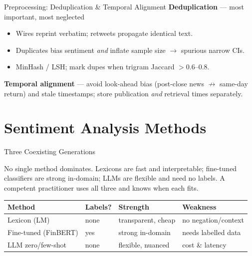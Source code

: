 \documentclass[9pt,t]{beamer}
\begin{document}
\begin{frame}{Preprocessing: Deduplication \& Temporal Alignment}
\textbf{Deduplication} --- most important, most neglected
\begin{itemize}\small
  \item Wires reprint verbatim; retweets propagate identical text.
  \item Duplicates bias sentiment \emph{and} inflate sample size $\to$ spurious narrow CIs.
  \item MinHash / LSH; mark dupes when trigram Jaccard $> 0.6$--$0.8$.
\end{itemize}

\textbf{Temporal alignment} --- avoid \alert{look-ahead bias} (post-close news $\nrightarrow$ same-day return)
and \alert{stale timestamps}; store publication \emph{and} retrieval times separately.
\end{frame}

\section{Sentiment Analysis Methods}

\begin{frame}{Three Coexisting Generations}
\begin{bigpicture}
No single method dominates. Lexicons are fast and interpretable; fine-tuned
classifiers are strong in-domain; LLMs are flexible and need no labels.
A competent practitioner uses all three and knows when each fits.
\end{bigpicture}

\medskip
\begin{tabular}{llll}
\toprule
\textbf{Method} & \textbf{Labels?} & \textbf{Strength} & \textbf{Weakness} \\
\midrule
Lexicon (LM)      & none      & transparent, cheap & no negation/context \\
Fine-tuned (FinBERT) & yes    & strong in-domain   & needs labelled data \\
LLM zero/few-shot & none      & flexible, nuanced  & cost \& latency \\
\bottomrule
\end{tabular}
\end{frame}
\end{document}
